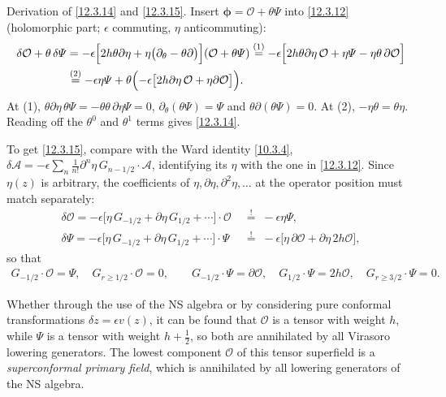 \begin{tcolorbox}[breakable]
	\begin{remark}
		Derivation of \eqref{12.3.14} and \eqref{12.3.15}. Insert $\bm\phi=\mathcal O+\theta\varPsi$ into \eqref{12.3.12} (holomorphic part; $\epsilon$ commuting, $\eta$ anticommuting):
		\begin{align*}
			\delta\mathcal O+\theta\,\delta\varPsi
			&=-\epsilon\Bigl[2h\theta\partial\eta+\eta\bigl(\partial_{\theta}-\theta\partial\bigr)\Bigr](\mathcal O+\theta\varPsi)
			\overset{(1)}{=} -\epsilon\Bigl[2h\theta\partial\eta\,\mathcal O+\eta\varPsi-\eta\theta\,\partial\mathcal O\Bigr]\\
			&\overset{(2)}{=} -\epsilon\eta\varPsi+\theta\Bigl(-\epsilon\bigl[2h\partial\eta\,\mathcal O+\eta\partial\mathcal O\bigr]\Bigr) .
		\end{align*}
		At (1), $\theta\partial\eta\,\theta\varPsi=-\theta\theta\,\partial\eta\varPsi=0$, $\partial_{\theta}(\theta\varPsi)=\varPsi$ and $\theta\partial(\theta\varPsi)=0$. At (2), $-\eta\theta=\theta\eta$. Reading off the $\theta^{0}$ and $\theta^{1}$ terms gives \eqref{12.3.14}.

		To get \eqref{12.3.15}, compare with the Ward identity \eqref{10.3.4}, $\delta\mathscr A=-\epsilon\sum_{n}\frac{1}{n!}\partial^{n}\eta\,G_{n-1/2}\cdot\mathscr A$, identifying its $\eta$ with the one in \eqref{12.3.12}. Since $\eta(z)$ is arbitrary, the coefficients of $\eta,\partial\eta,\partial^{2}\eta,\dots$ at the operator position must match separately:
		\begin{align*}
			\delta\mathcal O=-\epsilon\bigl[\eta\,G_{-1/2}+\partial\eta\,G_{1/2}+\cdots\bigr]\cdot\mathcal O\;&\overset{!}{=}\;-\epsilon\eta\varPsi ,\\
			\delta\varPsi=-\epsilon\bigl[\eta\,G_{-1/2}+\partial\eta\,G_{1/2}+\cdots\bigr]\cdot\varPsi\;&\overset{!}{=}\;-\epsilon\bigl[\eta\,\partial\mathcal O+\partial\eta\,2h\mathcal O\bigr] ,
		\end{align*}
		so that
		\begin{align*}
			G_{-1/2}\cdot\mathcal O=\varPsi,\quad G_{r\ge1/2}\cdot\mathcal O=0,\qquad
			G_{-1/2}\cdot\varPsi=\partial\mathcal O,\quad G_{1/2}\cdot\varPsi=2h\mathcal O,\quad G_{r\ge3/2}\cdot\varPsi=0 .
		\end{align*}
	\end{remark}
\end{tcolorbox}
Whether through the use of the NS algebra or by considering pure conformal transformations $\delta z=\epsilon v(z)$, it can be found that $\mathcal{O}$ is a tensor with weight $h$, while $\varPsi$ is a tensor with weight $h+\tfrac{1}{2}$, so both are annihilated by all Virasoro lowering generators. The lowest component $\mathcal{O}$ of this tensor superfield is a \textit{superconformal primary field}, which is annihilated by all lowering generators of the NS algebra.

